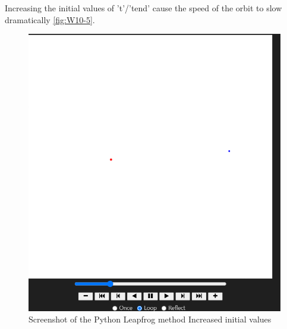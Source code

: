 Increasing the initial values of 't'/'tend' cause the speed of the orbit to slow dramatically \autoref{fig:W10-5}.
\begin{figure}[H] 
    \centering
    \includegraphics[width=0.49\columnwidth]{Figures/Week 10/5.png}
    \caption{Screenshot of the Python Leapfrog method Increased initial values}
    \label{fig:W10-5}
\end{figure}
\newpage




